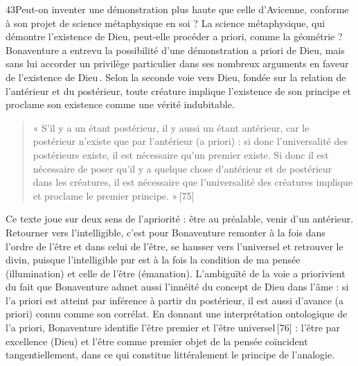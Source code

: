 43Peut-on inventer une démonstration plus haute que celle d’Avicenne, conforme à son projet de science métaphysique en soi ? La science métaphysique, qui démontre l’existence de Dieu, peut-elle procéder a priori, comme la géométrie ? Bonaventure a entrevu la possibilité d’une démonstration a priori de Dieu, mais sans lui accorder un privilège particulier dans ses nombreux arguments en faveur de l’existence de Dieu . Selon la seconde voie vers Dieu, fondée sur la relation de l’antérieur et du postérieur, toute créature implique l’existence de son principe et proclame son existence comme une vérité indubitable. 
\begin{quote}
    « S’il y a un étant postérieur, il y aussi un étant antérieur, car le postérieur n’existe que par l’antérieur (a priori) : si donc l’universalité des postérieurs existe, il est nécessaire qu’un premier existe. Si donc il est nécessaire de poser qu’il y a quelque chose d’antérieur et de postérieur dans les créatures, il est nécessaire que l’universalité des créatures implique et proclame le premier principe. » [75]
\end{quote}
 Ce texte joue sur deux sens de l’apriorité : être au préalable, venir d’un antérieur. Retourner vers l’intelligible, c’est pour Bonaventure remonter à la fois dans l’ordre de l’être et dans celui de l’être, se hausser vers l’universel et retrouver le divin, puisque l’intelligible pur est à la fois la condition de ma pensée (illumination) et celle de l’être (émanation). L’ambiguïté de la voie a priorivient du fait que Bonaventure admet aussi l’innéité du concept de Dieu dans l’âme : si l’a priori est atteint par inférence à partir du postérieur, il est aussi d’avance (a priori) connu comme son corrélat. En donnant une interprétation ontologique de l’a priori, Bonaventure identifie l’être premier et l’être universel [76] : l’être par excellence (Dieu) et l’être comme premier objet de la pensée coïncident tangentiellement, dans ce qui constitue littéralement le principe de l’analogie.

